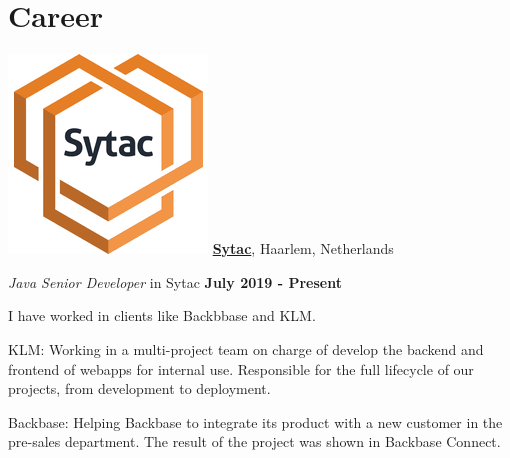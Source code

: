 \section{Career}
%
\includegraphics[scale=0.1]{companies/sytac.png} \href{https://www.sytac.op/}{\textbf{Sytac}},
Haarlem, Netherlands
\begin{outerlist}
\item[] \textit{Java Senior Developer} in Sytac%
        \hfill \textbf{July 2019 - Present}

I have worked in clients like Backbbase and KLM.
\begin{innerlist}
\item KLM: Working in a multi-project team on charge of develop the backend and frontend of webapps for internal use. Responsible for the full lifecycle of our projects, from development to deployment.

\item Backbase: Helping Backbase to integrate its product with a new customer in the pre-sales department. The result of the project was shown in Backbase Connect.

\end{innerlist}

\end{outerlist}

